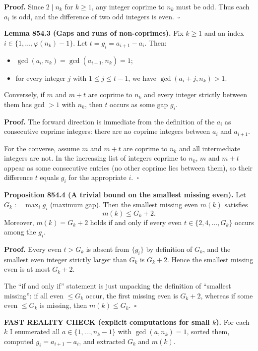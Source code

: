 \textbf{Proof.}
Since $2\mid n_k$ for $k\ge 1$, any integer coprime to $n_k$ must be odd. Thus each $a_i$ is odd, and the difference of two odd integers is even.\ $\square$

\medskip
\textbf{Lemma 854.3 (Gaps and runs of non-coprimes).}
Fix $k\ge 1$ and an index $i\in\{1,\dots,\varphi(n_k)-1\}$. Let $t=g_i=a_{i+1}-a_i$. Then:
\begin{itemize}
\item $\gcd(a_i,n_k)=\gcd(a_{i+1},n_k)=1$;
\item for every integer $j$ with $1\le j\le t-1$, we have $\gcd(a_i+j,n_k)>1$.
\end{itemize}
Conversely, if $m$ and $m+t$ are coprime to $n_k$ and every integer strictly between them has gcd $>1$ with $n_k$, then $t$ occurs as some gap $g_i$.

\textbf{Proof.}
The forward direction is immediate from the definition of the $a_i$ as consecutive coprime integers: there are no coprime integers between $a_i$ and $a_{i+1}$.

For the converse, assume $m$ and $m+t$ are coprime to $n_k$ and all intermediate integers are not. In the increasing list of integers coprime to $n_k$, $m$ and $m+t$ appear as some consecutive entries (no other coprime lies between them), so their difference $t$ equals $g_i$ for the appropriate $i$.\ $\square$

\medskip
\textbf{Proposition 854.4 (A trivial bound on the smallest missing even).}
Let $G_k := \max_i g_i$ (maximum gap). Then the smallest missing even $m(k)$ satisfies
\[
  m(k) \le G_k+2.
\]
Moreover, $m(k)=G_k+2$ holds if and only if every even $t\in\{2,4,\dots,G_k\}$ occurs among the $g_i$.

\textbf{Proof.}
Every even $t>G_k$ is absent from $\{g_i\}$ by definition of $G_k$, and the smallest even integer strictly larger than $G_k$ is $G_k+2$. Hence the smallest missing even is at most $G_k+2$.

The ``if and only if'' statement is just unpacking the definition of ``smallest missing'': if all even $\le G_k$ occur, the first missing even is $G_k+2$, whereas if some even $\le G_k$ is missing, then $m(k)\le G_k$.\ $\square$

\medskip
\textbf{FAST REALITY CHECK (explicit computations for small $k$).}
For each $k$ I enumerated all $a\in\{1,\dots,n_k-1\}$ with $\gcd(a,n_k)=1$, sorted them, computed $g_i=a_{i+1}-a_i$, and extracted $G_k$ and $m(k)$.

